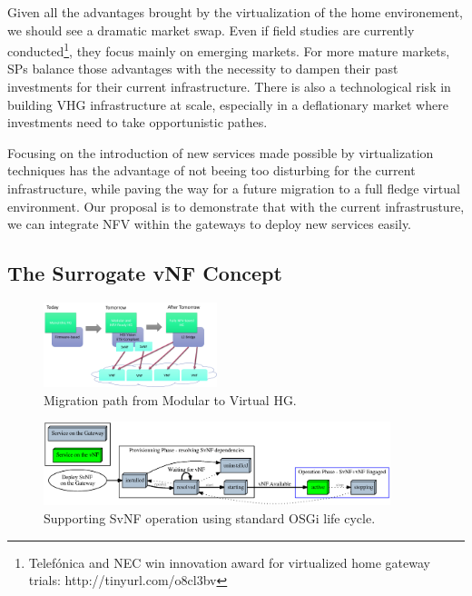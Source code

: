 
Given all the advantages brought by the virtualization of the home environement, we should see a dramatic market swap.
Even if field studies are currently conducted\footnote{Telefónica and NEC win innovation award for virtualized home gateway trials: http://tinyurl.com/o8cl3bv}, they focus mainly on emerging markets.
For more mature markets, SPs balance those advantages with the necessity to dampen their past investments for their current infrastructure.
There is also a technological risk in building VHG infrastructure at scale, especially in a deflationary market where investments need to take opportunistic pathes. 

Focusing on the introduction of new services made possible by virtualization techniques has the advantage of not beeing too disturbing for the current infrastructure, while paving the way for a future migration to a full fledge virtual environment. Our proposal is to demonstrate that with the current infrastrusture, we can integrate NFV within the gateways to deploy new services easily.

\subsection{The Surrogate vNF Concept}
\begin{figure}
  \begin{center}
    \includegraphics[width=0.45\textwidth,natwidth=6000,natheight=4000]{fig/vhgMigrationPath.png}
  \end{center}
  \caption{ Migration path from Modular to Virtual HG.
    \label{fig:migration}
  }
\end{figure}	

\begin{figure}
	
	\center

	\includegraphics[width=0.90\textwidth]{fig/osgi.eps}
	\caption{ Supporting SvNF operation using standard OSGi life cycle.
    \label{fig:osgisvnf}
    }

\end{figure}
	   


